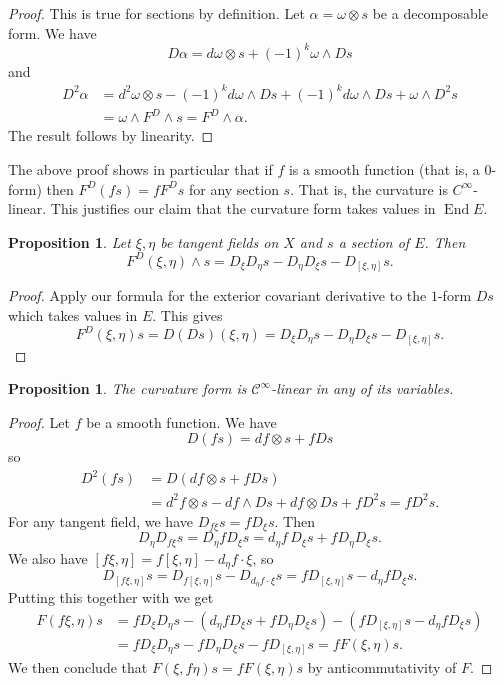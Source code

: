 \documentclass[10pt,a4paper]{article}
\newtheorem{prop}[theo]{Proposition}
\newtheorem*{proof}{Proof}
\newcommand{\cc}[1]{\mathcal{#1}}
\DeclareMathOperator{\End}{End}
\begin{document}
\begin{proof}
This is true for sections by definition. Let $\alpha = \omega \otimes s$ be a decomposable form. We have
$$
D\alpha = d\omega \otimes s + (-1)^k \omega \wedge Ds
$$
and
\begin{align*}
D^2 \alpha
&= d^2 \omega \otimes s - (-1)^k d\omega \wedge Ds
+ (-1)^k d\omega \wedge Ds + \omega \wedge D^2 s
\\
&= \omega \wedge F^D \wedge s
= F^D \wedge \alpha.
\end{align*}
The result follows by linearity.
\end{proof}

The above proof shows in particular that if $f$ is a smooth function (that is, a $0$-form) then $F^D(f s) = f F^D s$ for any section $s$. That is, the curvature is $C^\infty$-linear. This justifies our claim that the curvature form takes values in $\End E$.


\begin{prop}
\label{prop:curvature-commutative}
Let $\xi, \eta$ be tangent fields on $X$ and $s$ a section of $E$. Then
$$
F^D(\xi, \eta) \wedge s
= D_\xi D_\eta s - D_\eta D_\xi s - D_{[\xi,\eta]} s.
$$
\end{prop}

\begin{proof}
Apply our formula for the exterior covariant derivative to the $1$-form $Ds$ which takes values in $E$. This gives
\[
F^D(\xi,\eta) s
= D(Ds)(\xi,\eta)
= D_\xi D_\eta s - D_\eta D_\xi s - D_{[\xi,\eta]} s.
\]
\end{proof}


\begin{prop}
The curvature form is $\cc C^\infty$-linear in any of its variables.
\end{prop}

\begin{proof}
Let $f$ be a smooth function. We have
$$
D(fs) = df \otimes s + f Ds
$$
so
\begin{align*}
D^2(fs)
&= D(df \otimes s + f Ds)
\\
&= d^2f \otimes s - df \wedge Ds + df \otimes Ds + f D^2 s
= f D^2 s.
\end{align*}
For any tangent field, we have $D_{f\xi}s = f D_\xi s$. Then
$$
D_\eta D_{f \xi} s
= D_\eta f D_\xi s
= d_\eta f \, D_\xi s + f D_\eta D_\xi s.
$$
We also have $[f\xi, \eta] = f[\xi,\eta] - d_\eta f \cdot \xi$, so
$$
D_{[f\xi,\eta]}s
= D_{f[\xi,\eta]}s - D_{d_\eta f \cdot \xi} s
= f D_{[\xi,\eta]} s - d_\eta f D_\xi s.
$$
Putting this together with  we get
\begin{align*}
F(f \xi, \eta) s
&= f D_\xi D_\eta s - (d_\eta f D_\xi s + f D_\eta D_\xi s) - (f D_{[\xi,\eta]} s - d_\eta f D_\xi s)
\\
&= f D_\xi D_\eta s - f D_\eta D_\xi s - f D_{[\xi,\eta]} s
= f F(\xi, \eta) s.
\end{align*}
We then conclude that $F(\xi,f \eta)s = f F(\xi,\eta) s$ by anticommutativity of $F$.
\end{proof}
\end{document}
